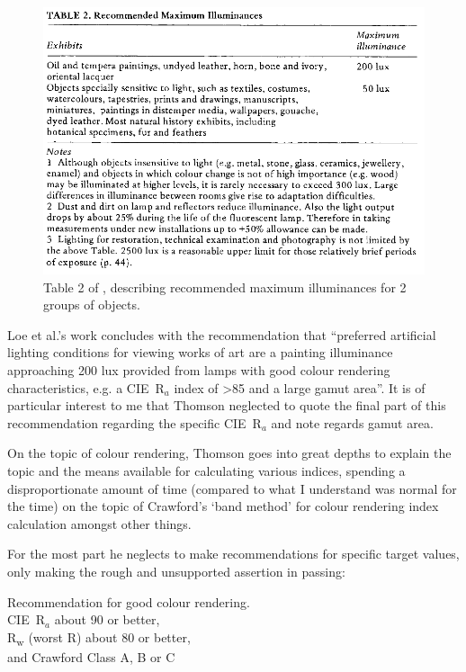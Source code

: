 \begin{figure}[htbp]
\includegraphics[max width=\textwidth]{figs/LitRev/Thomson.png}
\caption{Table 2 of \citet[p. 23]{thomson_museum_1986}, describing recommended maximum illuminances for 2 groups of objects.}
\label{fig:Thomson}
\end{figure}

Loe et al.'s work concludes with the recommendation that ``preferred artificial lighting conditions for viewing works of art are a painting illuminance approaching 200 lux provided from lamps with good colour rendering characteristics, e.g. a \gls{CIE}~R$_a$ index of \textgreater 85 and a large gamut area''. It is of particular interest to me that Thomson neglected to quote the final part of this recommendation regarding the specific \gls{CIE}~R$_a$ and note regards gamut area.

On the topic of colour rendering, Thomson goes into great depths to explain the topic and the means available for calculating various indices, spending a disproportionate amount of time (compared to what I understand was normal for the time) on the topic of Crawford's `band method' \citep{crawford_colour_1960,crawford_measurement_1959} for colour rendering index calculation amongst other things.

For the most part he neglects to make recommendations for specific target values, only making the rough and unsupported assertion in passing: 

\begin{itquote}{}
Recommendation for good colour rendering. \\
\gls{CIE}~R$_a$ about 90 or better, \\
R\textsubscript{w} (worst R) about 80 or better, \\
and Crawford Class A, B or C
\end{itquote}

